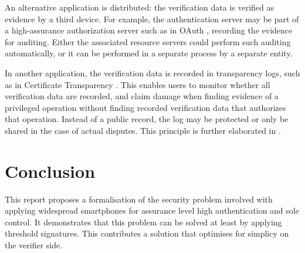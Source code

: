 \documentclass[a4paper]{article}
\begin{document}
An alternative application is distributed: the verification data is verified as evidence by a third device. For example, the authentication server may be part of a high-assurance authorization server such as in OAuth \cite{rfc6749}, recording the evidence for auditing. Either the associated resource servers could perform such auditing automatically, or it can be performed in a separate process by a separate entity.

In another application, the verification data is recorded in transparency logs, such as in Certificate Transparency \cite{rfc9162}. This enables users to monitor whether all verification data are recorded, and claim damage when finding evidence of a privileged operation without finding recorded verification data that authorizes that operation. Instead of a public record, the log may be protected or only be shared in the case of actual disputes. This principle is further elaborated in \cite{Verheul2024}.

\section{Conclusion}

This report proposes a formalisation of the security problem involved with applying widespread smartphones for assurance level high authentication and sole control. It demonstrates that this problem can be solved at least by applying threshold signatures. This contributes a solution that optimises for simplicy on the verifier side.

\printbibliography
\end{document}
